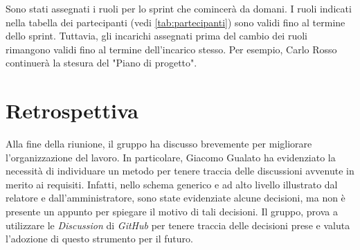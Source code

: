Sono stati assegnati i ruoli per lo sprint che comincerà da domani. I ruoli
indicati nella tabella dei partecipanti (vedi \autoref{tab:partecipanti}) sono
validi fino al termine dello sprint. Tuttavia, gli incarichi assegnati prima del
cambio dei ruoli rimangono validi fino al termine dell'incarico stesso. Per
esempio, Carlo Rosso continuerà la stesura del "Piano di progetto".

\section{Retrospettiva}

Alla fine della riunione, il gruppo ha discusso brevemente per migliorare
l'organizzazione del lavoro. In particolare, Giacomo Gualato ha evidenziato la
necessità di individuare un metodo per tenere traccia delle discussioni avvenute
in merito ai requisiti. Infatti, nello schema generico e ad alto livello
illustrato dal relatore e dall'amministratore, sono state evidenziate alcune
decisioni, ma non è presente un appunto per spiegare il motivo di tali
decisioni. Il gruppo, prova a utilizzare le \textit{Discussion} di
\textit{GitHub} per tenere traccia delle decisioni prese e valuta l'adozione di
questo strumento per il futuro.
